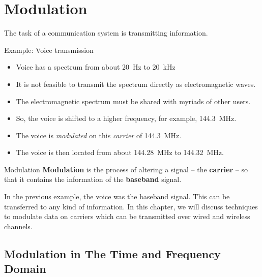 %
%
%

\chapter{Modulation}

\begin{refsection}
	
The task of a communication system is transmitting information.

Example: Voice transmission
\begin{itemize}
	\item Voice has a spectrum from about \SI{20}{Hz} to \SI{20}{kHz}
	\item It is not feasible to transmit the spectrum directly as electromagnetic waves.
	\item The electromagnetic spectrum must be shared with myriads of other users.
	\item So, the voice is shifted to a higher frequency, for example, \SI{144.3}{MHz}.
	\item The voice is \emph{modulated} on this \emph{carrier} of \SI{144.3}{MHz}.
	\item The voice is then located from about \SI{144.28}{MHz} to \SI{144.32}{MHz}.
\end{itemize}

\begin{definition}{Modulation}
	 \textbf{Modulation} is the process of altering a signal -- the  \textbf{carrier} -- so that it contains the information of the  \textbf{baseband} signal.
\end{definition}

In the previous example, the voice was the baseband signal. This can be transferred to any kind of information. In this chapter, we will discuss techniques to modulate data on carriers which can be transmitted over wired and wireless channels.


\section{Modulation in The Time and Frequency Domain}


\end{refsection}
